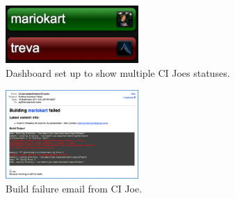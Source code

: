     \begin{figure}
    \centering
    \includegraphics[width=0.45\textwidth]{images/joe-dashboard}
    \caption{Dashboard set up to show multiple CI Joes statuses.}
    \label{joe-dashboard}
    \end{figure}

    \begin{figure}
    \centering
    \includegraphics[width=0.45\textwidth]{images/joe-email}
    \caption{Build failure email from CI Joe.}
    \label{joe-email}
    \end{figure}

